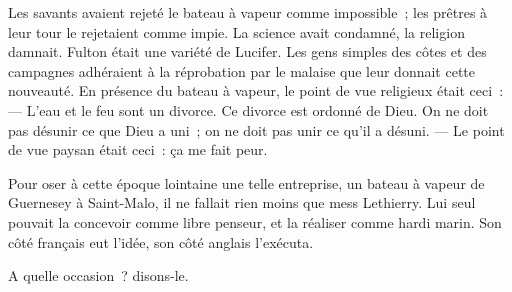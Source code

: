 \documentclass[french,twoside]{book} %
\begin{document}
Les savants avaient rejeté le bateau à vapeur comme impossible ; les prêtres à leur tour le rejetaient comme impie. La science avait condamné, la religion damnait. Fulton était une variété de Lucifer. Les gens simples des côtes et des campagnes adhéraient à la réprobation par le malaise que leur donnait cette nouveauté. En présence du bateau à vapeur, le point de vue religieux était ceci : — L’eau et le feu sont un divorce. Ce divorce est ordonné de Dieu. On ne doit pas désunir ce que Dieu a uni ; on ne doit pas unir ce qu’il a désuni. — Le point de vue paysan était ceci : ça me fait peur.\par
Pour oser à cette époque lointaine une telle entreprise, un bateau à vapeur de Guernesey à Saint-Malo, il ne fallait rien moins que mess Lethierry. Lui seul pouvait la concevoir comme libre penseur, et la réaliser comme hardi marin. Son côté français eut l’idée, son côté anglais l’exécuta.\par
A quelle occasion ? disons-le.
\end{document}

